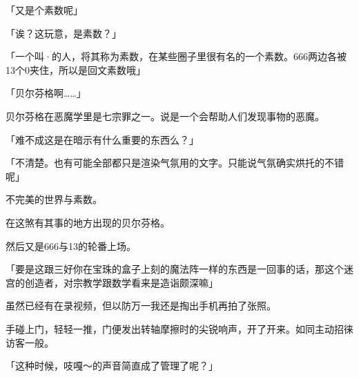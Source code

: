 「又是个素数呢」

「诶？这玩意，是素数？」

「一个叫·的人，将其称为素数，在某些圈子里很有名的一个素数。666两边各被13个0夹住，所以是回文素数哦」

「贝尔芬格啊……」

贝尔芬格在恶魔学里是七宗罪之一。说是一个会帮助人们发现事物的恶魔。

「难不成这是在暗示有什么重要的东西么？」

「不清楚。也有可能全部都只是渲染气氛用的文字。只能说气氛确实烘托的不错呢」

不完美的世界与素数。

在这煞有其事的地方出现的贝尔芬格。

然后又是666与13的轮番上场。

「要是这跟三好你在宝珠的盒子上刻的魔法阵一样的东西是一回事的话，那这个迷宫的创造者，对宗教学跟数学看来是造诣颇深嘛」

虽然已经有在录视频，但以防万一我还是掏出手机再拍了张照。

手碰上门，轻轻一推，门便发出转轴摩擦时的尖锐响声，开了开来。如同主动招徕访客一般。

「这种时候，吱嘎～的声音简直成了管理了呢？」

